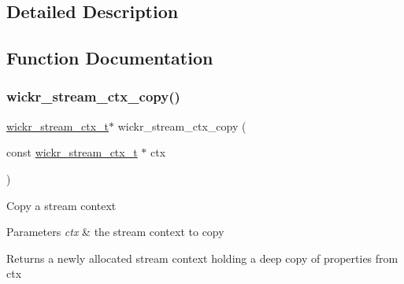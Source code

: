 \subsection{Detailed Description}


\subsection{Function Documentation}
\mbox{\label{group__wickr__stream_ga707b685e35eb437c33f5ec32c6760005}} 
\subsubsection{\texorpdfstring{wickr\+\_\+stream\+\_\+ctx\+\_\+copy()}{wickr\_stream\_ctx\_copy()}}
{\footnotesize\ttfamily \mbox{\hyperlink{structwickr__stream__ctx}{wickr\+\_\+stream\+\_\+ctx\+\_\+t}}$\ast$ wickr\+\_\+stream\+\_\+ctx\+\_\+copy (\begin{DoxyParamCaption}\item[{const \mbox{\hyperlink{structwickr__stream__ctx}{wickr\+\_\+stream\+\_\+ctx\+\_\+t}} $\ast$}]{ctx }\end{DoxyParamCaption})}

Copy a stream context


\begin{DoxyParams}{Parameters}
{\em ctx} & the stream context to copy \\
\hline
\end{DoxyParams}
\begin{DoxyReturn}{Returns}
a newly allocated stream context holding a deep copy of properties from \textquotesingle{}ctx\textquotesingle{} 
\end{DoxyReturn}
\mbox{\label{group__wickr__stream_ga0b5c513a3e0958dc7fd4f8455206e32e}} 
